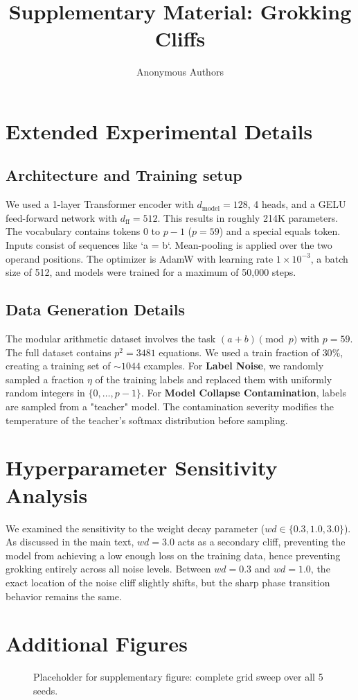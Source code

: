 \documentclass{article}
\title{Supplementary Material: Grokking Cliffs}
\author{
  Anonymous Authors \\
}
\begin{document}
\maketitle

\appendix

\section{Extended Experimental Details}

\subsection{Architecture and Training setup}
We used a 1-layer Transformer encoder with $d_{\text{model}}=128$, 4 heads, and a GELU feed-forward network with $d_{\text{ff}}=512$. This results in roughly 214K parameters. The vocabulary contains tokens $0$ to $p-1$ ($p=59$) and a special equals token. Inputs consist of sequences like `a = b`. Mean-pooling is applied over the two operand positions. The optimizer is AdamW with learning rate $1 \times 10^{-3}$, a batch size of 512, and models were trained for a maximum of 50,000 steps.

\subsection{Data Generation Details}
The modular arithmetic dataset involves the task $(a + b) \pmod p$ with $p=59$. The full dataset contains $p^2 = 3481$ equations. We used a train fraction of $30\%$, creating a training set of $\sim 1044$ examples.
For \textbf{Label Noise}, we randomly sampled a fraction $\eta$ of the training labels and replaced them with uniformly random integers in $\{0, \dots, p-1\}$.
For \textbf{Model Collapse Contamination}, labels are sampled from a "teacher" model. The contamination severity modifies the temperature of the teacher's softmax distribution before sampling.

\section{Hyperparameter Sensitivity Analysis}

We examined the sensitivity to the weight decay parameter ($wd \in \{0.3, 1.0, 3.0\}$). As discussed in the main text, $wd=3.0$ acts as a secondary cliff, preventing the model from achieving a low enough loss on the training data, hence preventing grokking entirely across all noise levels. Between $wd=0.3$ and $wd=1.0$, the exact location of the noise cliff slightly shifts, but the sharp phase transition behavior remains the same.

\section{Additional Figures}

\begin{figure}[ht]
    \centering
    \caption{Placeholder for supplementary figure: complete grid sweep over all 5 seeds.}
    \label{fig:supp_grid}
\end{figure}
\end{document}
